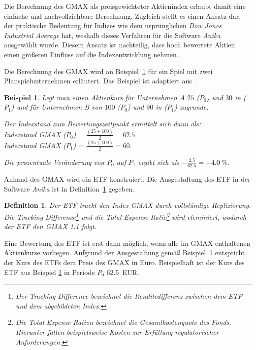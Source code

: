 \documentclass[12pt, a4paper]{article}
\theoremstyle{plain}
\newtheorem{definition}{Definition}
\newtheorem{example}{Beispiel}
\begin{document}
Die Berechnung des \gls{GMAX} als preisgewichteter Aktienindex erlaubt damit eine einfache und nachvollziehbare Berechnung. Zugleich stellt es einen Ansatz dar, der praktische Bedeutung für Indizes wie dem usprünglichen \textit{Dow Jones Industrial Average} hat, weshalb dieses Verfahren für die Software \textit{Anika} ausgewählt wurde. Diesem Ansatz ist nachteilig, dass hoch bewertete Aktien einen größeren Einfluss auf die Indexentwicklung nehmen.

Die Berechnung des \gls{GMAX} wird an Beispiel~\ref{ex:gmax} für ein Spiel mit zwei Planspielunternehmen erläutert.
Das Beispiel ist adaptiert aus \textcite[][S.~44]{bodie_investments_2018}.
\begin{example}
\label{ex:gmax}
Legt man einen Aktienkurs für Unternehmen A $25$ ($P_0$) und $30$ in ($P_1$) und für Unternehmen B von $100$ ($P_0$) und $90$ in ($P_1$) zugrunde.

Der Indexstand zum Bewertungszeitpunkt ermittelt sich dann als:\\
Indexstand \gls{GMAX} ($P_0$) = $\frac{(25 + 100)}{2} = 62.5$\\
Indexstand \gls{GMAX} ($P_1$) = $\frac{(25 + 100)}{2} = 60.$

Die prozentuale Veränderung von $P_0$ auf $P_1$ ergibt sich als $-\frac{2.5}{62.5} = -4.0~\%$.
\end{example}

 Anhand des \gls{GMAX} wird ein \gls{ETF} konstruiert. Die Ausgestaltung des \gls{ETF} in der Software \textit{Anika} ist in Definition~\ref{def:etf} gegeben.
\begin{definition}
	\label{def:etf}
	Der \gls{ETF} trackt den Index \gls{GMAX} durch vollständige Replizierung. Die \textit{Tracking Difference}\footnote{Der \textit{Tracking Difference} bezeichnet die Renditedifferenz zwischen dem \gls{ETF} und dem abgebildeten Index.} und die \textit{Total Expense Ratio}\footnote{Die \textit{Total Expense Ration} bezeichnet die Gesamtkostenquote des Fonds. Hierunter fallen beispielsweise Kosten zur Erfüllung regulatorischer Anforderungen.} wird eleminiert, wodurch der \gls{ETF} den \gls{GMAX} 1:1 folgt.
\end{definition}

Eine Bewertung des \gls{ETF} ist erst dann möglich, wenn alle im \gls{GMAX} enthaltenen Aktienkurse vorliegen. Aufgrund der Ausgestaltung gemäß Beispiel~\ref{def:etf} entspricht der Kurs des \glspl{ETF} dem Preis des \gls{GMAX} in Euro. 
Beispielhaft ist der Kurs des \gls{ETF} aus Beispiel \ref{ex:gmax} in Periode $P_0$ $62.5$~EUR.
\end{document}
